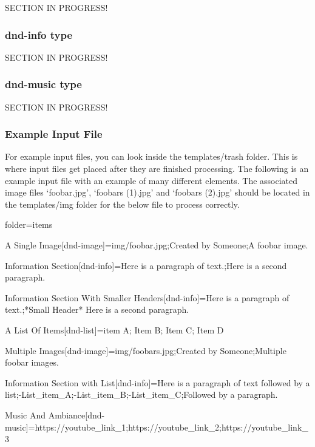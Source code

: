 SECTION IN PROGRESS!

\subsubsection{dnd-info type}

SECTION IN PROGRESS!

\subsubsection{dnd-music type}

SECTION IN PROGRESS!

\subsubsection{Example Input File}

For example input files, you can look inside the templates/trash folder. This is where input files get placed after they are finished processing. The following is an example input file with an example of many different elements. The associated image files `foobar.jpg', `foobars (1).jpg' and `foobars (2).jpg' should be located in the templates/img folder for the below file to process correctly.

\begin{inputfile}
folder=items

A Single Image[dnd-image]=img/foobar.jpg;Created by Someone;A foobar image.

Information Section[dnd-info]=Here is a paragraph of text.;Here is a second paragraph.

Information Section With Smaller Headers[dnd-info]=Here is a paragraph of text.;*Small Header* Here is a second paragraph.

A List Of Items[dnd-list]=item A; Item B; Item C; Item D

Multiple Images[dnd-image]=img/foobars.jpg;Created by Someone;Multiple foobar images.

Information Section with List[dnd-info]=Here is a paragraph of text followed by a list;-List_item_A;-List_item_B;-List_item_C;Followed by a paragraph.

Music And Ambiance[dnd-music]=https://youtube_link_1;https://youtube_link_2;https://youtube_link_3
\end{inputfile}


